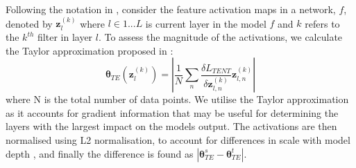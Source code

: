 \documentclass[conference]{IEEEtran}
\begin{document}
Following the notation in \cite{Dinsdale2022}, consider the feature activation maps in a network, $f$, denoted by $\bm{z}_l^{(k)}$ where $ l \in {1... L}$ is current layer in the model $f$ and $k$ refers to the $k^{th}$ filter in layer $l$. To assess the magnitude of the activations, we calculate the Taylor approximation proposed in \cite{Molchanov2017}:
\begin{equation}
    \bm{\theta}_{TE} (\bm{z}_l^{(k)}) = \left| \frac{1}{N} \sum_n \frac{\delta L_{TENT}}{\delta \bm{z}_{l,n}^{(k)}}  \bm{z}_{l,n}^{(k)} \right|
\end{equation}
where  N is the total number of data points. We utilise the Taylor approximation as it accounts for gradient information that may be useful for determining the layers with the largest impact on the models output. The activations are then normalised using L2 normalisation, to account for differences in scale with model depth \cite{Molchanov2017}, and finally the difference is found as $|\bm{\theta}_{TE}^s - \bm{\theta}_{TE}^t|$.
\end{document}
